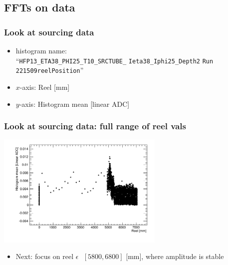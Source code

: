 \documentclass[bigger]{beamer}
\begin{document}
\subsection{FFTs on data}
\label{sec-3-1}
\begin{frame}
\frametitle{Look at sourcing data}
\label{sec-3-1-1}
\begin{itemize}

\item histogram name:\\
\label{sec-3-1-1-1}%
``\texttt{HFP13\_ETA38\_PHI25\_T10\_SRCTUBE\_} \newline{}
\texttt{Ieta38\_Iphi25\_Depth2}  \newline{}
\texttt{Run 221509reelPosition}''

\item $x$-axis: Reel [mm]
\label{sec-3-1-1-2}%

\item $y$-axis: Histogram mean [linear ADC]
\label{sec-3-1-1-3}%
\end{itemize} %
\end{frame}
\begin{frame}
\frametitle{Look at sourcing data: full range of reel vals}
\label{sec-3-1-2}
\label{sec-3-1-2-1}

\centering
\includegraphics[width=0.6\textwidth]{fig/sourcing_unzoomed_plot.png}
\begin{itemize}

\item Next: focus on \(\text{reel } \epsilon \text{ } [5800, 6800] \text{ [mm]}\), where amplitude is stable
\label{sec-3-1-2-2}%
\end{itemize} %
\end{frame}
\end{document}
